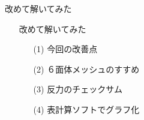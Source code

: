 \begin{frame}{改めて解いてみた}
  \begin{itemize}
      \item[] 改めて解いてみた
      \begin{itemize}[itemsep=1.3ex, leftmargin=1cm]
        \item[(1)]  今回の改善点
	\item[(2)]  ６面体メッシュのすすめ
	\item[(3)]  反力のチェックサム
	\item[(4)]  表計算ソフトでグラフ化
      \end{itemize}
  \end{itemize}
\end{frame}
